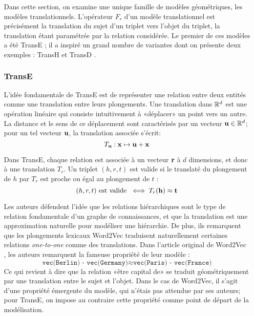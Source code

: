 Dans cette section, on examine une unique famille de modèles géométriques, les modèles translationnels. L'opérateur $F_r$ d'un modèle translationnel est précisément la translation du sujet d'un triplet vers l'objet du triplet, la translation étant paramétrée par la relation considérée. Le premier de ces modèles a été TransE \cite{bordes2013translating}; il a inspiré un grand nombre de variantes dont on présente deux exemples : TransH \cite{transh} et TransD \cite{transd}.

\subsubsection{TransE \cite{bordes2013translating}}

L'idée fondamentale de TransE est de représenter une relation entre deux entités comme une translation entre leurs plongements. Une translation dans $\R^d$ est une opération linéaire qui consiste intuitivement à «déplacer» un point vers un autre. La distance et le sens de ce déplacement sont caractérisés par un vecteur $\bf{u} \in \R^d$; pour un tel vecteur $\bf{u}$, la translation associée s'écrit:
\begin{equation}
    T_\bf{u} : \bf{x} \mapsto \bf{u + x}
\end{equation}

Dans TransE, chaque relation est associée à un vecteur $\bf{r}$ à $d$ dimensions, et donc à une translation $T_r$. Un triplet $(h, r, t)$ est valide si le translaté du plongement de $h$ par $T_r$ est proche ou égal au plongement de $t$ :
\begin{equation}
    (h, r, t) \text{ est valide } \iff T_r(\bf{h}) \approx \bf{t} 
\end{equation}

Les auteurs défendent l'idée que les relations hiérarchiques sont le type de relation fondamentale d'un graphe de connaissances, et que la translation est une approximation naturelle pour modéliser une hiérarchie. %
De plus, ils remarquent que les plongements lexicaux Word2Vec \cite{mikolov2013distributed} traduisent naturellement certaines relations \textit{one-to-one} comme des translations. Dans l'article original de Word2Vec \cite{mikolov2013distributed}, les auteurs remarquent la fameuse propriété de leur modèle :
\begin{equation}
    \texttt{vec(Berlin) - vec(Germany)} \approx 
    \texttt{vec(Paris) - vec(France)}
\end{equation}
Ce qui revient à dire que la relation «être capital de» se traduit géométriquement par une translation entre le sujet et l'objet. Dans le cas de Word2Vec, il s'agit d'une propriété émergente du modèle, qui n'étais pas attendue par ses auteurs; pour TransE, on impose au contraire cette propriété comme point de départ de la modélisation.

